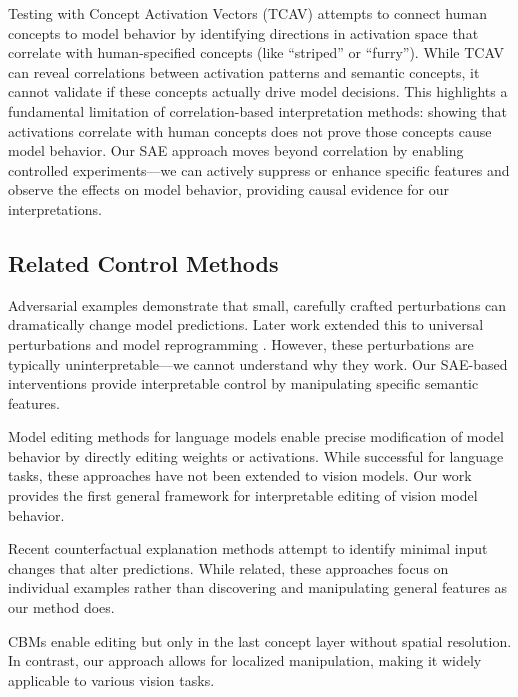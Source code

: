 Testing with Concept Activation Vectors (TCAV) \citep{kim2018tcav} attempts to connect human concepts to model behavior by identifying directions in activation space that correlate with human-specified concepts (like ``striped'' or ``furry''). 
While TCAV can reveal correlations between activation patterns and semantic concepts, it cannot validate if these concepts actually drive model decisions. 
This highlights a fundamental limitation of correlation-based interpretation methods: showing that activations correlate with human concepts does not prove those concepts cause model behavior. 
Our SAE approach moves beyond correlation by enabling controlled experiments---we can actively suppress or enhance specific features and observe the effects on model behavior, providing causal evidence for our interpretations.

\subsection{Related Control Methods}

Adversarial examples \citep{szegedy2013intriguing,goodfellow2014explaining,moosavi2016deepfool} demonstrate that small, carefully crafted perturbations can dramatically change model predictions. Later work extended this to universal perturbations \citep{moosavi2017universal} and model reprogramming \citep{elsayed2018adversarial}. 
However, these perturbations are typically uninterpretable---we cannot understand why they work. 
Our SAE-based interventions provide interpretable control by manipulating specific semantic features.

Model editing methods for language models \citep{meng2022rome,meng2023memit} enable precise modification of model behavior by directly editing weights or activations. While successful for language tasks, these approaches have not been extended to vision models. Our work provides the first general framework for interpretable editing of vision model behavior.

Recent counterfactual explanation methods \citep{goyal2019counterfactual} attempt to identify minimal input changes that alter predictions. 
While related, these approaches focus on individual examples rather than discovering and manipulating general features as our method does.

CBMs \citep{koh2020concept} enable editing but only in the last concept layer without spatial resolution. 
In contrast, our approach allows for localized manipulation, making it widely applicable to various vision tasks.

